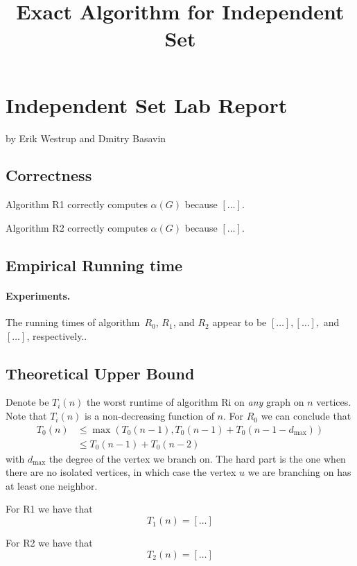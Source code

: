 \documentclass{tufte-handout}
\title{\sf Exact Algorithm for Independent Set}
\author{}
\begin{document}
\maketitle

\section{Independent Set Lab Report}
by Erik Westrup and Dmitry Basavin

\subsection{Correctness}
Algorithm R1 correctly computes $\alpha(G)$ because $[\ldots]$.

\noindent
Algorithm R2 correctly computes $\alpha(G)$ because $[\ldots]$.

\subsection{Empirical Running time}

\paragraph{Experiments.}

\medskip
\noindent

    

The running times of algorithm~$R_0$, $R_1$, and $R_2$ appear to be
$[\ldots],[\ldots],$ and $[\ldots]$, respectively..

\subsection{Theoretical Upper Bound}

Denote be $T_i(n)$ the worst runtime of algorithm Ri on \emph{any} graph on $n$ vertices.
Note that $T_i(n)$ is a non-decreasing function of $n$.
For $R_0$ we can conclude that
\begin{align*}
T_0(n) &\leq\max(T_0(n-1), T_0(n-1)+T_0(n-1-d_{\mbox{max}})) \\ &\leq T_0(n-1)+T_0(n-2)
\end{align*}
with $d_{\mbox{max}}$ the degree of the vertex we branch on. The hard part is the one when there are no isolated vertices, in which case the vertex $u$ we are branching on has at least one neighbor. 

For R1 we have that
 \[
 T_1(n)=[\ldots]
 \]

For R2 we have that
 \[
 T_2(n)=[\ldots]
 \]
\end{document}
